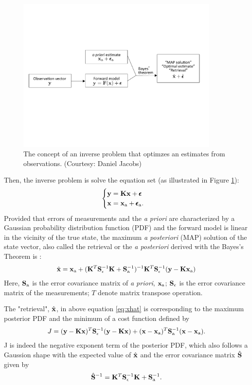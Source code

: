 \begin{figure}[t]
  \centering
  \includegraphics[width={0.9\textwidth}]{figures/MAP.pdf}
  \caption{The concept of an inverse problem that optimzes an estimates
from observations. (Courtesy: Daniel Jacobs)}
  \label{fig:map}
\end{figure}

Then, the inverse problem is solve the equation set (as
illustrated in Figure \ref{fig:map}):
\begin{equation}
\begin{cases}
\mathbf{y} = \mathbf{K}\mathbf{x} + \pmb{\epsilon} \\
\mathbf{x} = \mathbf{x}_\text{a} + \pmb{\epsilon}_\text{a}.
\end{cases}
\label{eq:inverse2}
\end{equation}
Provided that errors of measurements and the \textit{a priori} are characterized
by a Gaussian probability distribution function (PDF) and the forward
model is linear in the vicinity of the true state, the maximum
\textit{a posteriori} (MAP) solution of the state vector, also called the 
retrieval or the \textit{a posteriori} derived with the Bayes's Theorem
is \citep{Rodgers00}:
\begin{equation}
\hat{\mathbf{x}} = \mathbf{x}_\text{a} + (\mathbf{K}^T\mathbf{S}_\epsilon^{-1}\mathbf{K}+\mathbf{S}_\text{a}^{-1})^{-1}
\mathbf{K}^T\mathbf{S}_\epsilon^{-1}(\mathbf{y}-\mathbf{K}\mathbf{x}_\text{a}) \label{eq:xhat}
\end{equation}
Here, $\mathbf{S}_\text{a}$ is the error covariance matrix of \textit{a priori},
$\mathbf{x}_\text{a}$; $\mathbf{S}_\epsilon$ is the error covariance matrix of the
measurements; $T$ denote matrix transpose operation. 

The "retrieval", $\hat{\mathbf{x}}$, in above equation \eqref{eq:xhat}
is corresponding to the maximum posterior
PDF and the minimum of a cost function defined by
\begin{equation}
J = (\mathbf{y}-\mathbf{K}\mathbf{x})^T\mathbf{S}_\epsilon^{-1}(\mathbf{y}-\mathbf{K}\mathbf{x}) +
    (\mathbf{x}-\mathbf{x}_\text{a})^T\mathbf{S}_\text{a}^{-1}(\mathbf{x}-\mathbf{x}_\text{a}).
\label{eq:cost2}
\end{equation} 
J is indeed the negative exponent term of the posterior PDF, which also
follows a Gaussion shape with the expected value of $\hat{\mathbf{x}}$ and
the error covariance matrix $\hat{\mathbf{S}}$ given by
\begin{equation}
\hat{\mathbf{S}}^{-1} = \mathbf{K}^T\mathbf{S}_\epsilon^{-1}\mathbf{K}+\mathbf{S}_\text{a}^{-1}. \label{eq:shat}
\end{equation}

